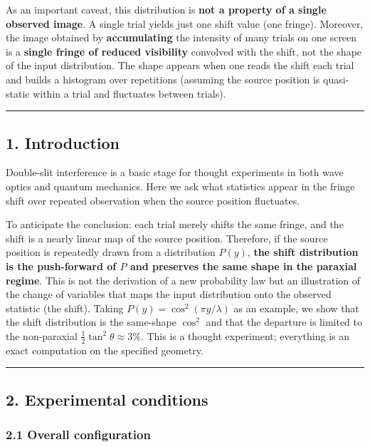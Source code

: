 \documentclass[
]{article}
\begin{document}
As an important caveat, this distribution is \textbf{not a property of a
single observed image}. A single trial yields just one shift value (one
fringe). Moreover, the image obtained by \textbf{accumulating} the
intensity of many trials on one screen is a \textbf{single fringe of
reduced visibility} convolved with the shift, not the shape of the input
distribution. The shape appears when one reads the shift each trial and
builds a histogram over repetitions (assuming the source position is
quasi-static within a trial and fluctuates between trials).

\begin{center}\rule{0.5\linewidth}{0.5pt}\end{center}

\subsection{1. Introduction}\label{introduction}

Double-slit interference is a basic stage for thought experiments in
both wave optics and quantum mechanics. Here we ask what statistics
appear in the fringe shift over repeated observation when the source
position fluctuates.

To anticipate the conclusion: each trial merely shifts the same fringe,
and the shift is a nearly linear map of the source position. Therefore,
if the source position is repeatedly drawn from a distribution \(P(y)\),
\textbf{the shift distribution is the push-forward of \(P\) and
preserves the same shape in the paraxial regime}. This is not the
derivation of a new probability law but an illustration of the change of
variables that maps the input distribution onto the observed statistic
(the shift). Taking \(P(y)=\cos^2(\pi y/\lambda)\) as an example, we
show that the shift distribution is the same-shape \(\cos^2\) and that
the departure is limited to the non-paraxial
\(\tfrac12\tan^2\theta\approx3\%\). This is a thought experiment;
everything is an exact computation on the specified geometry.

\begin{center}\rule{0.5\linewidth}{0.5pt}\end{center}

\subsection{2. Experimental conditions}\label{experimental-conditions}

\subsubsection{2.1 Overall configuration}\label{overall-configuration}
\end{document}
